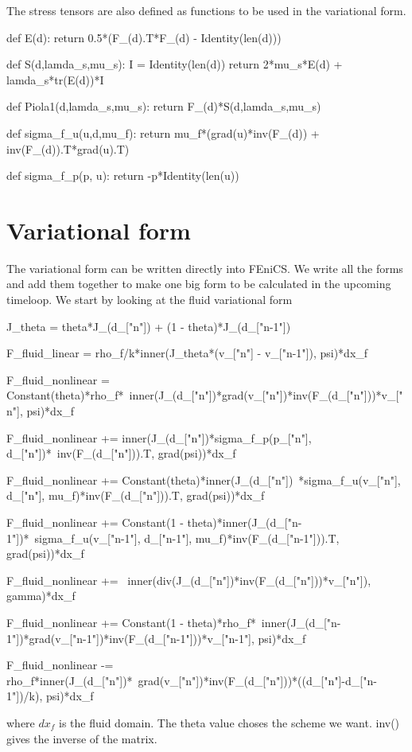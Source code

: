 The stress tensors are also defined as functions to be used in the variational form.

\begin{python}
def E(d):
	return 0.5*(F_(d).T*F_(d) - Identity(len(d))) 

def S(d,lamda_s,mu_s):
    I = Identity(len(d))
    return 2*mu_s*E(d) + lamda_s*tr(E(d))*I

def Piola1(d,lamda_s,mu_s):
	return F_(d)*S(d,lamda_s,mu_s)
	
def sigma_f_u(u,d,mu_f):
    return  mu_f*(grad(u)*inv(F_(d)) + inv(F_(d)).T*grad(u).T)

def sigma_f_p(p, u):
    return -p*Identity(len(u))
    
\end{python}

\section{Variational form}

The variational form can be written directly into FEniCS. We write all the forms and add them together to make one big form to be calculated in the upcoming timeloop. We start by looking at the fluid variational form
\begin{python}
J_theta = theta*J_(d_["n"]) + (1 - theta)*J_(d_["n-1"])

F_fluid_linear = rho_f/k*inner(J_theta*(v_["n"] - v_["n-1"]), psi)*dx_f

F_fluid_nonlinear =  Constant(theta)*rho_f*\
inner(J_(d_["n"])*grad(v_["n"])*inv(F_(d_["n"]))*v_["n"], psi)*dx_f

F_fluid_nonlinear += inner(J_(d_["n"])*sigma_f_p(p_["n"], d_["n"])*\
inv(F_(d_["n"])).T, grad(psi))*dx_f

F_fluid_nonlinear += Constant(theta)*inner(J_(d_["n"])\
*sigma_f_u(v_["n"], d_["n"], mu_f)*inv(F_(d_["n"])).T, grad(psi))*dx_f

F_fluid_nonlinear += Constant(1 - theta)*inner(J_(d_["n-1"])*\
sigma_f_u(v_["n-1"], d_["n-1"], mu_f)*inv(F_(d_["n-1"])).T, grad(psi))*dx_f

F_fluid_nonlinear += \
inner(div(J_(d_["n"])*inv(F_(d_["n"]))*v_["n"]), gamma)*dx_f

F_fluid_nonlinear += Constant(1 - theta)*rho_f*\
inner(J_(d_["n-1"])*grad(v_["n-1"])*inv(F_(d_["n-1"]))*v_["n-1"], psi)*dx_f

F_fluid_nonlinear -= rho_f*inner(J_(d_["n"])*\
grad(v_["n"])*inv(F_(d_["n"]))*((d_["n"]-d_["n-1"])/k), psi)*dx_f
\end{python}
where $dx_f$ is the fluid domain. The theta value choses the scheme we want. inv() gives the inverse of the matrix. 


